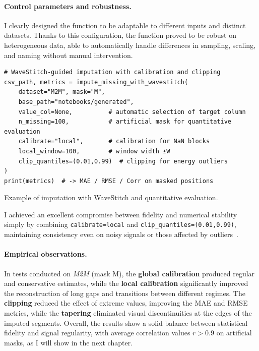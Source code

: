 \paragraph{Control parameters and robustness.}
I clearly designed the function to be adaptable to different inputs and distinct datasets.  
Thanks to this configuration, the function proved to be robust on heterogeneous data, able to automatically handle differences in sampling, scaling, and naming without manual intervention.

\begin{listing}[H]
\begin{verbatim}
# WaveStitch-guided imputation with calibration and clipping
csv_path, metrics = impute_missing_with_wavestitch(
    dataset="M2M", mask="M",
    base_path="notebooks/generated",
    value_col=None,          # automatic selection of target column
    n_missing=100,           # artificial mask for quantitative evaluation
    calibrate="local",       # calibration for NaN blocks
    local_window=100,        # window width ±W
    clip_quantiles=(0.01,0.99)  # clipping for energy outliers
)
print(metrics)  # -> MAE / RMSE / Corr on masked positions
\end{verbatim}
\caption{Example of imputation with WaveStitch and quantitative evaluation.}
\label{lst:wavestitch_imputation}
\end{listing}

I achieved an excellent compromise between fidelity and numerical stability simply by combining \texttt{calibrate=local} and \texttt{clip\_quantiles=(0.01,0.99)}, maintaining consistency even on noisy signals or those affected by outliers~\cite{little2019statistical,shumway2017time}.

\paragraph{Empirical observations.}
In tests conducted on \emph{M2M} (mask M), the \textbf{global calibration} produced regular and conservative estimates, while the \textbf{local calibration} significantly improved the reconstruction of long gaps and transitions between different regimes.  
The \textbf{clipping} reduced the effect of extreme values, improving the MAE and RMSE metrics, while the \textbf{tapering} eliminated visual discontinuities at the edges of the imputed segments.  
Overall, the results show a solid balance between statistical fidelity and signal regularity, with average correlation values $r > 0.9$ on artificial masks, as I will show in the next chapter.

